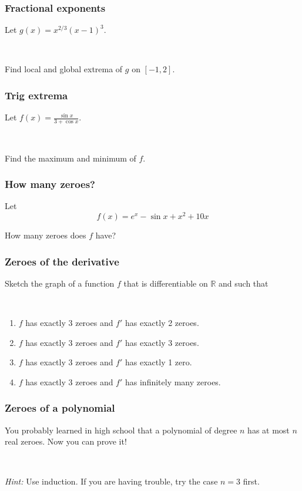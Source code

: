 \documentclass[14pt]{beamer}
\newcommand {\DS} [1] {${\displaystyle #1}$}
\newcommand {\R}{\mathbb{R}}
\begin{document}
\begin{frame}[t]
\frametitle{Fractional exponents}

Let
	\DS{
		g(x) = x^{2/3} (x-1)^3.
	}
	
\

Find local and global extrema of $g$ on \DS{[-1,2]}.

\end{frame}
\begin{frame}[t]
\frametitle{Trig extrema}

Let
	\DS{
		f(x) = \frac{\sin x}{3 + \cos x}.
	}

\
	
Find the maximum and minimum of $f$.

\end{frame}
\begin{frame}[t]
\frametitle{How many zeroes?}

Let
	$$
		f(x) = e^x - \sin x + x^2 + 10x
	$$
	
How many zeroes does $f$ have?
	
\end{frame}
\begin{frame}[t]
\frametitle{Zeroes of the derivative}

Sketch the graph of a function $f$ that is differentiable on $\R$ and such that

\

	\begin{enumerate}
		\item $f$ has exactly 3 zeroes and $f'$ has exactly 2 zeroes.
		\item $f$ has exactly 3 zeroes and $f'$ has exactly 3 zeroes.
		\item  $f$ has exactly 3 zeroes and $f'$ has exactly 1 zero.
		\item  $f$ has exactly 3 zeroes and $f'$ has infinitely many zeroes.
	\end{enumerate}


\end{frame}
\begin{frame}[t]
\frametitle{Zeroes of a polynomial}

You probably learned in high school that a polynomial of degree $n$ has at most $n$ real zeroes.  Now you can prove it!

\

\emph{Hint:}  Use induction.  If you are having trouble, try the case $n=3$ first.


\end{frame}
\end{document}
